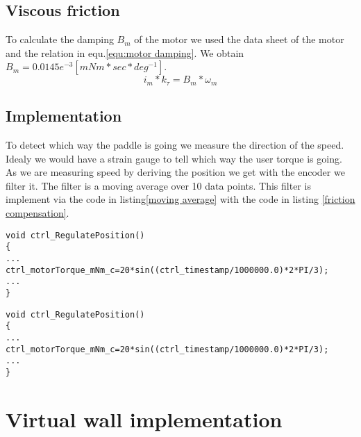 \documentclass[11pt,a4paper,oneside,notitlepage]{article}
\begin{document}

\subsection{Viscous friction}
To calculate the damping $B_m$ of the motor we used the data sheet of the motor and the relation in equ.\ref{equ:motor damping}.
We obtain $B_m=0.0145e^{-3} [mNm*sec*deg^{-1}]$.
\begin{equation}\label{equ:motor damping} 
i_m*k_\tau=B_m*\omega_m
\end{equation}

\subsection{Implementation}
To detect which way the paddle is going we measure the direction of the speed. Idealy we would have a strain gauge to tell which way the user torque is going. As we are measuring speed by deriving the position we get with the encoder we filter it. The filter is a moving average over 10 data points. This filter is implement via the code in listing\ref{moving average}  with the code in listing \ref{friction compensation}.

\begin{lstlisting}[caption=moving average filter,label=moving average]
void ctrl_RegulatePosition()
{
...    
ctrl_motorTorque_mNm_c=20*sin((ctrl_timestamp/1000000.0)*2*PI/3);
...
}

\end{lstlisting}

\begin{lstlisting}[caption=Friction compensation implementation,label=friction compensation]
void ctrl_RegulatePosition()
{
...    
ctrl_motorTorque_mNm_c=20*sin((ctrl_timestamp/1000000.0)*2*PI/3);
...
}

\end{lstlisting}

\section{Virtual wall implementation}
\end{document}
